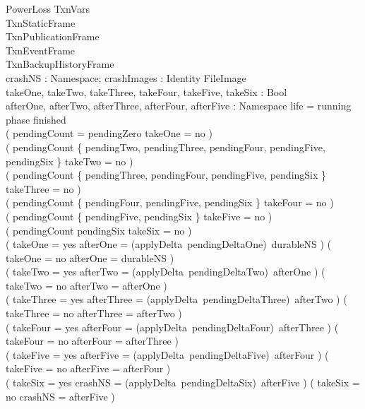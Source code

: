 \documentclass{article}
\begin{document}
\begin{schema}{PowerLoss}
	\Delta TxnVars \\
	TxnStaticFrame \\
	TxnPublicationFrame \\
	TxnEventFrame \\
	TxnBackupHistoryFrame \\
	crashNS : Namespace; crashImages : Identity \pfun FileImage \\
	takeOne, takeTwo, takeThree, takeFour, takeFive, takeSix : Bool \\
	afterOne, afterTwo, afterThree, afterFour, afterFive : Namespace
	\where
	life = running \land phase \neq finished \\
	( pendingCount = pendingZero \implies takeOne = no ) \\
	( pendingCount \notin \{ pendingTwo, pendingThree, pendingFour, pendingFive,
	pendingSix \} \implies takeTwo = no ) \\
	( pendingCount \notin \{ pendingThree, pendingFour, pendingFive, pendingSix \}
	\implies takeThree = no ) \\
	( pendingCount \notin \{ pendingFour, pendingFive, pendingSix \}
	\implies takeFour = no ) \\
	( pendingCount \notin \{ pendingFive, pendingSix \} \implies takeFive = no ) \\
	( pendingCount \neq pendingSix \implies takeSix = no ) \\
	( takeOne = yes \implies afterOne = (applyDelta~pendingDeltaOne)~durableNS ) \land
	( takeOne = no \implies afterOne = durableNS ) \\
	( takeTwo = yes \implies afterTwo = (applyDelta~pendingDeltaTwo)~afterOne ) \land
	( takeTwo = no \implies afterTwo = afterOne ) \\
	( takeThree = yes \implies afterThree = (applyDelta~pendingDeltaThree)~afterTwo )
	\land ( takeThree = no \implies afterThree = afterTwo ) \\
	( takeFour = yes \implies afterFour = (applyDelta~pendingDeltaFour)~afterThree )
	\land ( takeFour = no \implies afterFour = afterThree ) \\
	( takeFive = yes \implies afterFive = (applyDelta~pendingDeltaFive)~afterFour )
	\land ( takeFive = no \implies afterFive = afterFour ) \\
	( takeSix = yes \implies crashNS = (applyDelta~pendingDeltaSix)~afterFive )
	\land ( takeSix = no \implies crashNS = afterFive ) \\

\end{schema}
\end{document}
